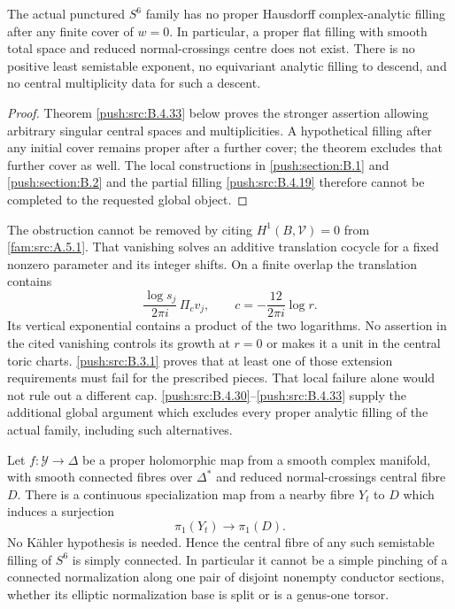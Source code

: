 \begin{corollary}\label{push:src:B.4.1}\label{push:B41}
The actual punctured $S^6$ family has no proper
Hausdorff complex-analytic filling after any finite
cover of $w=0$. In particular, a proper flat filling
with smooth total space and reduced normal-crossings
centre does not exist. There is no positive least
semistable exponent, no equivariant analytic filling
to descend, and no central multiplicity data for
such a descent.
\end{corollary}

\begin{proof}
Theorem \ref{push:src:B.4.33} below proves the stronger assertion
allowing arbitrary singular central spaces and
multiplicities. A hypothetical filling after any
initial cover remains proper after a further cover;
the theorem excludes that further cover as well.
The local constructions in \ref{push:section:B.1} and \ref{push:section:B.2} and the
partial filling \ref{push:src:B.4.19} therefore cannot be completed
to the requested global object.
\end{proof}

The obstruction cannot be removed by citing
$H^1(B,\mathcal V)=0$ from \cref{fam:src:A.5.1}. That
vanishing solves an additive translation
cocycle for a fixed nonzero parameter and
its integer shifts. On a finite overlap
the translation contains
\[
 \frac{\log s_j}{2\pi i}\,\Pi_c v_j,
 \qquad c=-\frac{12}{2\pi i}\log r.
\]
Its vertical exponential contains a product
of the two logarithms. No assertion in
the cited vanishing controls its growth
at $r=0$ or makes it a unit in the central
toric charts. \ref{push:src:B.3.1} proves that at least
one of those extension requirements must
fail for the prescribed pieces. That local
failure alone would not rule out a different cap.
\ref{push:src:B.4.30}--\ref{push:src:B.4.33} supply the additional global argument
which excludes every proper analytic filling of
the actual family, including such alternatives.

\begin{theorem}\label{push:src:B.4.2}\label{push:B42}
Let $f:\mathcal Y\to\Delta$ be a
proper holomorphic map from a smooth
complex manifold, with smooth connected
fibres over $\Delta^*$ and reduced
normal-crossings central fibre $D$.
There is a continuous specialization
map from a nearby fibre $Y_t$ to $D$
which induces a surjection
\[
 \pi_1(Y_t)\longrightarrow\pi_1(D).
\]
No K\"ahler hypothesis is needed.
Hence the central fibre of any such
semistable filling of $S^6$ is simply
connected. In particular it cannot
be a simple pinching of a connected
normalization along one pair of
disjoint nonempty conductor sections,
whether its elliptic normalization
base is split or is a genus-one torsor.
\end{theorem}

